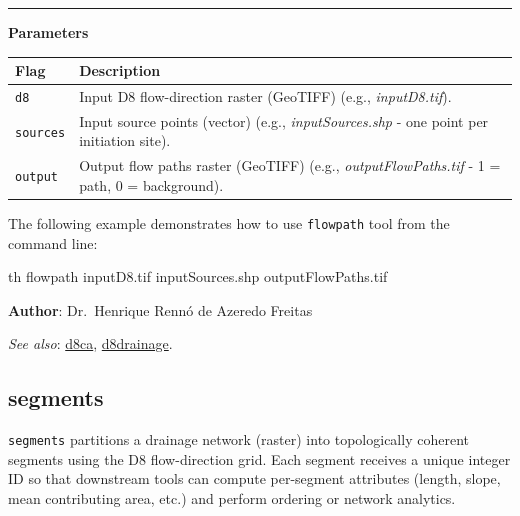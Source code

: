 \documentclass[
]{book}
\newenvironment{Shaded}{\begin{snugshade}}{\end{snugshade}}
\newcommand{\ExtensionTok}[1]{#1}
\newcommand{\NormalTok}[1]{#1}
\begin{document}
\begin{center}\rule{0.5\linewidth}{0.5pt}\end{center}

\textbf{Parameters}

\begin{longtable}[]{@{}
  >{\raggedright\arraybackslash}p{}
  >{\raggedright\arraybackslash}p{}@{}}
\toprule\noalign{}
\begin{minipage}[b]{\linewidth}\raggedright
Flag
\end{minipage} & \begin{minipage}[b]{\linewidth}\raggedright
Description
\end{minipage} \\
\midrule\noalign{}
\endhead
\bottomrule\noalign{}
\endlastfoot
\texttt{d8} & Input D8 flow-direction raster (GeoTIFF) (e.g., \emph{inputD8.tif}). \\
\texttt{sources} & Input source points (vector) (e.g., \emph{inputSources.shp} - one point per initiation site). \\
\texttt{output} & Output flow paths raster (GeoTIFF) (e.g., \emph{outputFlowPaths.tif} - 1 = path, 0 = background). \\
\end{longtable}

The following example demonstrates how to use \texttt{flowpath} tool from the command line:

\begin{Shaded}
\begin{Highlighting}[]
\ExtensionTok{th}\NormalTok{ flowpath inputD8.tif inputSources.shp outputFlowPaths.tif}
\end{Highlighting}
\end{Shaded}

\textbf{Author}: Dr.~Henrique Rennó de Azeredo Freitas

\emph{See also}: \hyperref[d8ca]{d8ca}, \hyperref[d8drainage]{d8drainage}.

\subsection{segments}\label{segments}

\texttt{segments} partitions a drainage network (raster) into topologically coherent segments using the D8 flow-direction grid. Each segment receives a unique integer ID so that downstream tools can compute per-segment attributes (length, slope, mean contributing area, etc.) and perform ordering or network analytics.
\end{document}
